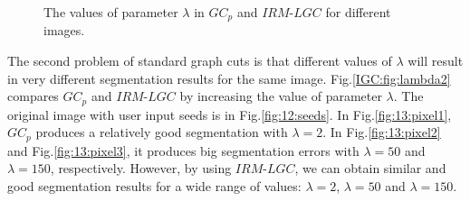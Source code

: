         \begin{figure}[htp]
        \centering
        \caption{
        The values of parameter $\lambda$ in $GC_p$ and $IRM$-$LGC$ for different images.
        }
        \label{fig:lambda1}
        \end{figure}

 The second problem of standard graph cuts is that different values of $\lambda$ will result in very different segmentation results for the same image. Fig.\ref{IGC:fig:lambda2} compares $GC_p$ and $IRM$-$LGC$ by increasing the value of parameter $\lambda$. The original image with user input seeds is in Fig.\ref{fig:12:seeds}. In Fig.\ref{fig:13:pixel1}, $GC_p$ produces a relatively good segmentation with $\lambda=2$. In Fig.\ref{fig:13:pixel2} and Fig.\ref{fig:13:pixel3}, it produces big segmentation errors with $\lambda=50$ and $\lambda=150$, respectively. However, by using $IRM$-$LGC$, we can obtain
similar and good segmentation results for a wide range of values: $\lambda=2$, $\lambda=50$ and $\lambda=150$.

